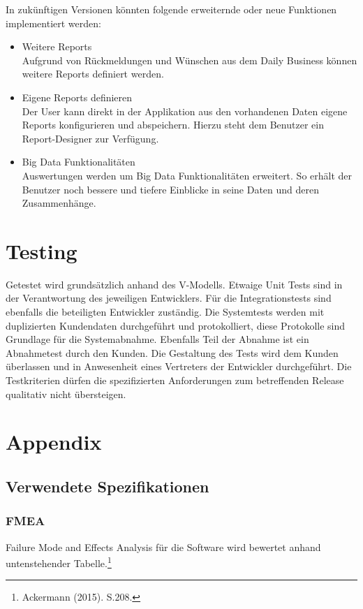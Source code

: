 \documentclass[a4paper]{scrreprt}
\begin{document}
In zukünftigen Versionen könnten folgende erweiternde oder neue Funktionen implementiert werden:
\begin{itemize}
\item Weitere Reports\\
Aufgrund von Rückmeldungen und Wünschen aus dem Daily Business können weitere Reports definiert werden.
\item Eigene Reports definieren\\
Der User kann direkt in der Applikation aus den vorhandenen Daten eigene Reports konfigurieren und abspeichern. Hierzu steht dem Benutzer ein Report-Designer zur Verfügung.
\item Big Data Funktionalitäten \\
Auswertungen werden um Big Data Funktionalitäten erweitert. So erhält der Benutzer noch bessere und tiefere Einblicke in seine Daten und deren Zusammenhänge.
\end{itemize}


\chapter{Testing}
Getestet wird grundsätzlich anhand des V-Modells. Etwaige Unit Tests sind in der Verantwortung des jeweiligen Entwicklers. Für die Integrationstests sind ebenfalls die beteiligten Entwickler zuständig.
Die Systemtests werden mit duplizierten Kundendaten durchgeführt und protokolliert, diese Protokolle sind Grundlage für die Systemabnahme. Ebenfalls Teil der Abnahme ist ein Abnahmetest durch den Kunden. Die Gestaltung des Tests wird dem Kunden überlassen und in Anwesenheit eines Vertreters der Entwickler durchgeführt. Die Testkriterien dürfen die spezifizierten Anforderungen zum betreffenden Release qualitativ nicht übersteigen.


\chapter{Appendix}

\section{Verwendete Spezifikationen}
\subsection{FMEA}
Failure Mode and Effects Analysis für die Software wird bewertet anhand untenstehender Tabelle.\footnote{Ackermann (2015). S.208.}
\end{document}
